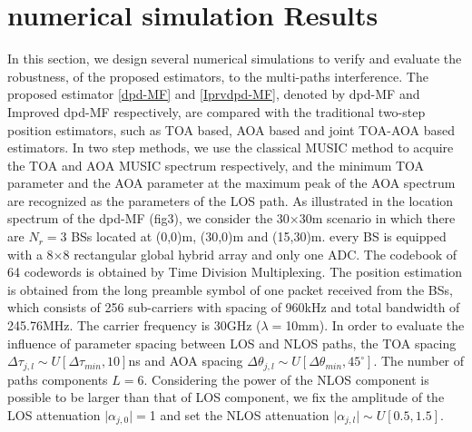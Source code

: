 \documentclass[journal]{IEEEtran}
\def \arg{\operatorname{arg}}
\begin{document}

\section{numerical simulation Results}
\label{sec:experiment}
In this section, we design several numerical simulations to verify and evaluate the robustness, of the proposed estimators, to the multi-paths interference. The proposed estimator \eqref{dpd-MF} and \eqref{Iprvdpd-MF}, denoted by dpd-MF and Improved dpd-MF respectively,
are compared with the traditional two-step position estimators, such as TOA based, AOA based and joint TOA-AOA based estimators. In two step methods, we use the classical MUSIC method to acquire the TOA and AOA MUSIC spectrum respectively, and the minimum TOA parameter and the AOA parameter at the maximum peak of the AOA spectrum are recognized as the parameters of the LOS path. 
As illustrated in the location spectrum of the dpd-MF (fig3), we consider the 30$\times$30m scenario in which there are $N_r=$3 BSs located at (0,0)m, (30,0)m and (15,30)m. every BS is equipped with a 8$\times$8 rectangular global hybrid array and only one ADC. The codebook of 64 codewords is obtained by Time Division Multiplexing.
The position estimation is obtained from the long preamble symbol of one packet received from the BSs, which consists of 256 sub-carriers with spacing of 960kHz and total bandwidth of 245.76MHz. The carrier frequency is 30GHz ($\lambda=$10mm).
In order to evaluate the influence of parameter spacing between LOS and NLOS paths, the TOA spacing $\Delta\tau_{j,l}\sim U[\Delta\tau_{min},10]$ns and AOA spacing $\Delta\theta_{j,l}\sim U[\Delta\theta_{min},45^\circ]$. The number of paths components $L=$6.
Considering the power of the NLOS component is possible to be larger than that of LOS component, we fix the amplitude of the LOS attenuation $\vert\alpha_{j,0}\vert=$1 and set the NLOS attenuation $\vert\alpha_{j,l}\vert\sim U[0.5,1.5]$.
\end{document}
